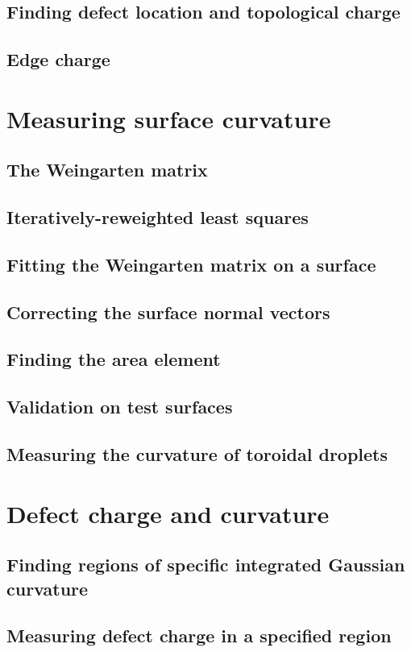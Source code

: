 \subsection{Finding defect location and topological charge}
\subsection{Edge charge}

\section{Measuring surface curvature}
\subsection{The Weingarten matrix}
\subsection{Iteratively-reweighted least squares}
\subsection{Fitting the Weingarten matrix on a surface}
\subsection{Correcting the surface normal vectors}
\subsection{Finding the area element}
\subsection{Validation on test surfaces}
\subsection{Measuring the curvature of toroidal droplets}

\section{Defect charge and curvature}
\subsection{Finding regions of specific integrated Gaussian curvature}
\subsection{Measuring defect charge in a specified region}
